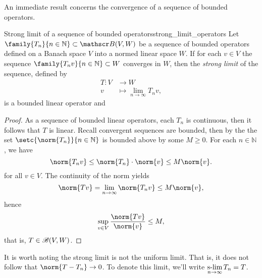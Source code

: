 An immediate result concerns the convergence of a sequence of bounded operators.
\begin{theorem}{Strong limit of a sequence of bounded operators}{strong_limit_operators}
    Let \(\family{T_n}{n\in \mathbb{N}} \subset \bounded(V,W)\) be a sequence of bounded operators defined on a Banach space \(V\) into a normed linear space \(W\). If for each \(v \in V\) the sequence \(\family{T_nv}{n \in \mathbb{N}}\subset W\) converges in \(W\), then the \emph{strong limit} of the sequence, defined by
    \begin{align*}
        T : V &\to W\\
            v &\mapsto \lim_{n\to \infty} T_n v,
    \end{align*}
    is a bounded linear operator and 
\end{theorem}
\begin{proof}
    As a sequence of bounded linear operators, each \(T_n\) is continuous, then it follows that \(T\) is linear. Recall convergent sequences are bounded, then by the  the set \(\setc{\norm{T_n}}{n \in \mathbb{N}}\) is bounded above by some \(M \geq 0\). For each \(n \in \mathbb{N}\), we have
    \begin{equation*}
        \norm{T_n v} \leq \norm{T_n} \cdot \norm{v} \leq M \norm{v}.
    \end{equation*}
    for all \(v \in V\). The continuity of the norm yields
    \begin{equation*}
        \norm{Tv} = \lim_{n\to\infty} \norm{T_n v} \leq M \norm{v},
    \end{equation*}
    hence
    \begin{equation*}
        \sup_{v \in V} \frac{\norm{Tv}}{\norm{v}} \leq M,
    \end{equation*}
    that is, \(T \in \mathscr{B}(V,W)\).
\end{proof}
\begin{remark}
    It is worth noting the strong limit is not the uniform limit. That is, it does not follow that \(\norm{T - T_n} \to 0\). To denote this limit, we'll write \(\displaystyle{\operatorname*{s-lim}_{n\to\infty} T_n = T}\).
\end{remark}

